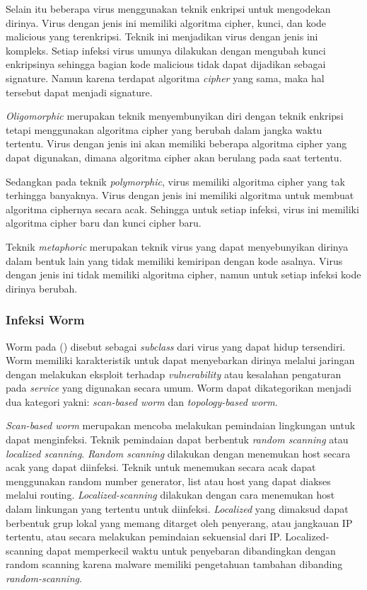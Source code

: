 Selain itu beberapa virus menggunakan teknik enkripsi untuk mengodekan dirinya. Virus dengan jenis ini memiliki algoritma cipher, kunci, dan kode malicious yang terenkripsi. Teknik ini menjadikan virus dengan jenis ini kompleks. Setiap infeksi virus umunya dilakukan dengan mengubah kunci enkripsinya sehingga bagian kode malicious tidak dapat dijadikan sebagai signature. Namun karena terdapat algoritma \textit{cipher} yang sama, maka hal tersebut dapat menjadi signature.

\textit{Oligomorphic} merupakan teknik menyembunyikan diri dengan teknik enkripsi tetapi menggunakan algoritma cipher yang berubah dalam jangka waktu tertentu. Virus dengan jenis ini akan memiliki beberapa algoritma cipher yang dapat digunakan, dimana algoritma cipher akan berulang pada saat tertentu.

Sedangkan pada teknik \textit{polymorphic}, virus memiliki algoritma cipher yang tak terhingga banyaknya. Virus dengan jenis ini memiliki algoritma untuk membuat algoritma ciphernya secara acak. Sehingga untuk setiap infeksi, virus ini memiliki algoritma cipher baru dan kunci cipher baru.

Teknik \textit{metaphoric} merupakan teknik virus yang dapat menyebunyikan dirinya dalam bentuk lain yang tidak memiliki kemiripan dengan kode asalnya. Virus dengan jenis ini tidak memiliki algoritma cipher, namun untuk setiap infeksi kode dirinya berubah.

\subsubsection{Infeksi Worm}

Worm pada (\cite{alsamer2016}) disebut sebagai \textit{subclass} dari virus yang dapat hidup tersendiri. Worm memiliki karakteristik untuk dapat menyebarkan dirinya melalui jaringan dengan melakukan eksploit terhadap \textit{vulnerability} atau kesalahan pengaturan pada \textit{service} yang digunakan secara umum. Worm dapat dikategorikan menjadi dua kategori yakni: \textit{scan-based worm} dan \textit{topology-based worm}.

\textit{Scan-based worm} merupakan mencoba melakukan pemindaian lingkungan untuk dapat menginfeksi. Teknik pemindaian dapat berbentuk \textit{random scanning} atau \textit{localized scanning}. \textit{Random scanning} dilakukan dengan menemukan host secara acak yang dapat diinfeksi. Teknik untuk menemukan secara acak dapat menggunakan random number generator, list atau host yang dapat diakses melalui routing. \textit{Localized-scanning} dilakukan dengan cara menemukan host dalam linkungan yang tertentu untuk diinfeksi. \textit{Localized} yang dimaksud dapat berbentuk grup lokal yang memang ditarget oleh penyerang, atau jangkauan IP tertentu, atau secara melakukan pemindaian sekuensial dari IP. Localized-scanning dapat memperkecil waktu untuk penyebaran dibandingkan dengan random scanning karena malware memiliki pengetahuan tambahan dibanding \textit{random-scanning}.

